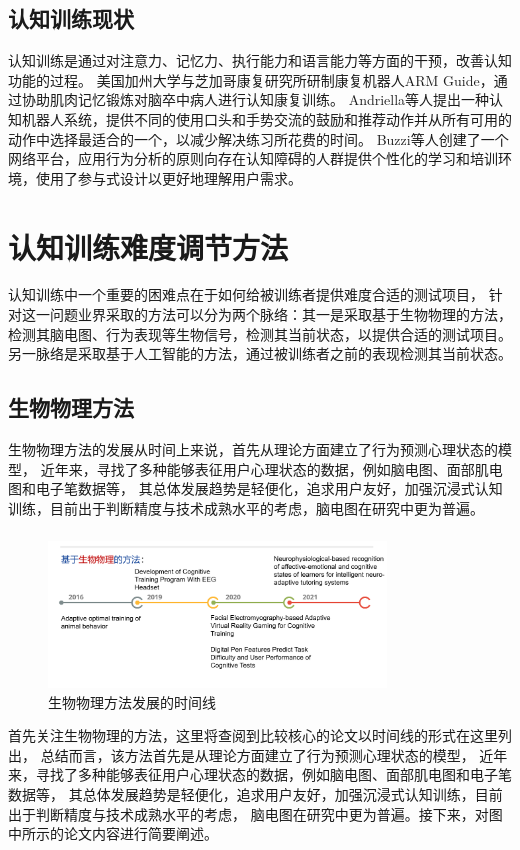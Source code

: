 \documentclass{article}
\begin{document}
        \subsection{认知训练现状}

        认知训练是通过对注意力、记忆力、执行能力和语言能力等方面的干预，改善认知功能的过程。
        美国加州大学与芝加哥康复研究所研制康复机器人ARM Guide，通过协助肌肉记忆锻炼对脑卒中病人进行认知康复训练。
        Andriella等人\cite{ref5}提出一种认知机器人系统，提供不同的使用口头和手势交流的鼓励和推荐动作并从所有可用的动作中选择最适合的一个，以减少解决练习所花费的时间。
        Buzzi等人\cite{ref6}创建了一个网络平台，应用行为分析的原则向存在认知障碍的人群提供个性化的学习和培训环境，使用了参与式设计以更好地理解用户需求。
            \section{认知训练难度调节方法}
            认知训练中一个重要的困难点在于如何给被训练者提供难度合适的测试项目，
            针对这一问题业界采取的方法可以分为两个脉络：其一是采取基于生物物理的方法，
            检测其脑电图、行为表现等生物信号，检测其当前状态，以提供合适的测试项目。
            另一脉络是采取基于人工智能的方法，通过被训练者之前的表现检测其当前状态。
        \subsection{生物物理方法}
        生物物理方法的发展从时间上来说，首先从理论方面建立了行为预测心理状态的模型\cite{ref7}，
        近年来，寻找了多种能够表征用户心理状态的数据，例如脑电图\cite{ref8}、面部肌电图和电子笔数据等，
        其总体发展趋势是轻便化，追求用户友好，加强沉浸式认知训练，目前出于判断精度与技术成熟水平的考虑，脑电图在研究中更为普遍。
            \subsubsection{}
            \begin{figure}[H]
            	\centering
            	\includegraphics[width=0.8\textwidth]{images/timeline_bio.png}
            	\caption{生物物理方法发展的时间线}
            	\label{fig:label}
            \end{figure}
            首先关注生物物理的方法，这里将查阅到比较核心的论文以时间线的形式在这里列出，
            总结而言，该方法首先是从理论方面建立了行为预测心理状态的模型，
            近年来，寻找了多种能够表征用户心理状态的数据，例如脑电图、面部肌电图和电子笔数据等，
            其总体发展趋势是轻便化，追求用户友好，加强沉浸式认知训练，目前出于判断精度与技术成熟水平的考虑，
            脑电图在研究中更为普遍。接下来，对图中所示的论文内容进行简要阐述。
\end{document}
